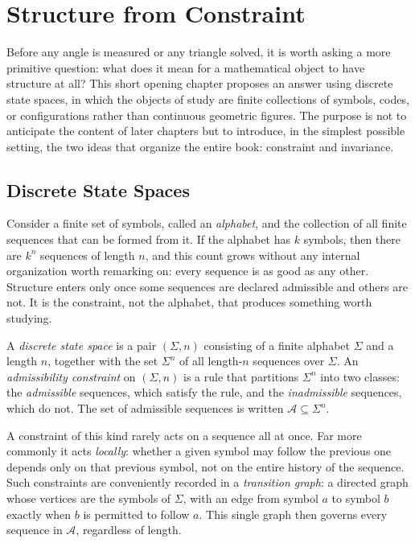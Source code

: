 \chapter{Structure from Constraint}
\label{ch:structure-from-constraint}

Before any angle is measured or any triangle solved, it is worth asking a more
primitive question: what does it mean for a mathematical object to have
structure at all? This short opening chapter proposes an answer using discrete
state spaces, in which the objects of study are finite collections of symbols,
codes, or configurations rather than continuous geometric figures. The purpose
is not to anticipate the content of later chapters but to introduce, in the
simplest possible setting, the two ideas that organize the entire book:
constraint and invariance.

\section{Discrete State Spaces}

Consider a finite set of symbols, called an \emph{alphabet}, and the collection
of all finite sequences that can be formed from it. If the alphabet has $k$
symbols, then there are $k^n$ sequences of length $n$, and this count grows
without any internal organization worth remarking on: every sequence is as
good as any other. Structure enters only once some sequences are declared
admissible and others are not. It is the constraint, not the alphabet, that
produces something worth studying.

\begin{definition}
A \emph{discrete state space} is a pair $(\Sigma, n)$ consisting of a finite
alphabet $\Sigma$ and a length $n$, together with the set $\Sigma^n$ of all
length-$n$ sequences over $\Sigma$. An \emph{admissibility constraint} on
$(\Sigma,n)$ is a rule that partitions $\Sigma^n$ into two classes: the
\emph{admissible} sequences, which satisfy the rule, and the
\emph{inadmissible} sequences, which do not. The set of admissible sequences
is written $\mathcal{A} \subseteq \Sigma^n$.
\end{definition}

A constraint of this kind rarely acts on a sequence all at once. Far more
commonly it acts \emph{locally}: whether a given symbol may follow the
previous one depends only on that previous symbol, not on the entire history
of the sequence. Such constraints are conveniently recorded in a
\emph{transition graph}: a directed graph whose vertices are the symbols of
$\Sigma$, with an edge from symbol $a$ to symbol $b$ exactly when $b$ is
permitted to follow $a$. This single graph then governs every sequence in
$\mathcal{A}$, regardless of length.

